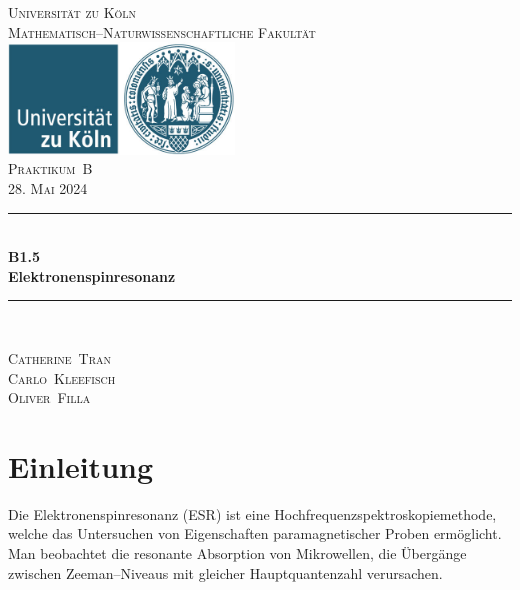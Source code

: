 \documentclass[12pt,a4paper]{scrartcl}
\numberwithin{equation}{section} %
\newcommand{\HRule}{\rule{\linewidth}{0.7mm}}
\begin{document}
\begin{titlepage}
	\pagestyle{empty}

	\begin{center}

	\textsc{\LARGE Universität zu Köln }\\ [0.4cm]
	\textsc{Mathematisch--Naturwissenschaftliche Fakultät} \\[1.5cm]

	\includegraphics[width=0.45\textwidth]{../media/uni.jpg} \\[1.5cm]  %

	\textsc{\Large Praktikum~B}\\[2mm]
	\textsc{28. Mai 2024}\\[10mm]
	\HRule \\[0.4cm]

		{	\Huge \bfseries B1.5}\\[0.4cm]
			{	\huge \bfseries Elektronenspinresonanz}\\[0.3cm]
	
	\HRule \\[3cm]

 	\begin{center}
		\textsc{\Large Catherine~Tran } \\[3pt]
		\textsc{\Large Carlo~Kleefisch } \\[3pt]
		\textsc{\Large Oliver~Filla } \\[3pt]
	\end{center}
	\end{center}
\end{titlepage}

\newpage
\tableofcontents
\newpage

\clearpage
\hypertarget{einleitung}{%
\section{Einleitung}\label{einleitung}}

Die Elektronenspinresonanz (ESR) ist eine Hochfrequenzspektroskopiemethode, welche das Untersuchen von Eigenschaften paramagnetischer Proben ermöglicht. Man beobachtet die resonante Absorption von Mikrowellen, die Übergänge zwischen Zeeman--Niveaus mit gleicher Hauptquantenzahl verursachen.
\end{document}
